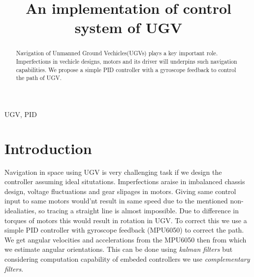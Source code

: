 \documentclass[conference]{IEEEtran}
\begin{document}
\title{An implementation of control system of UGV}
\author{
\and
{}
\and
{}
\and
{}
}

\maketitle

\begin{abstract}
Navigation of Unmanned Ground Vechicles(UGVs) plays a key important role. Imperfections in vechicle designs, motors and its driver will underpins such navigation capabilities. We propose a simple PID controller with a gyroscope feedback to control the path of UGV. 
\end{abstract}

\begin{IEEEkeywords}
UGV, PID
\end{IEEEkeywords}

\section{Introduction}
Navigation in space using UGV is very challenging task if we design the controller assuming ideal situtations. Imperfections araise in imbalanced chassis design, voltage fluctuations and gear slipages in motors. Giving same control input to same motors would'nt result in same speed due to the mentioned non-idealiaties, so tracing a straight line is almost impossible. Due to difference in torques of motors this would result in rotation in UGV. To correct this we use a simple PID controller with gyroscope feedback (MPU6050) to correct the path. We get angular velocities and accelerations from the MPU6050 then from which we estimate angular orientations. This can be done using \textit{kalman filters} but considering computation capability of embeded controllers we use \textit{complementary filters}.
\end{document}
